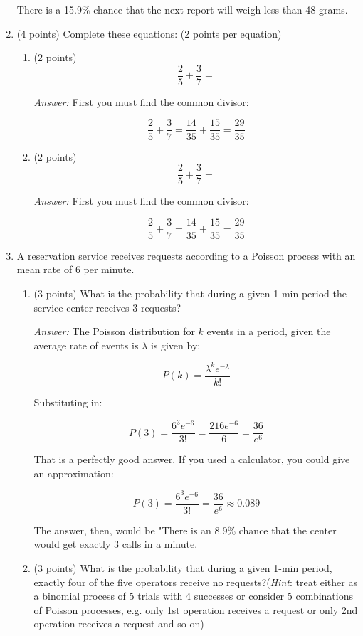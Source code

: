 \documentclass[letterpaper,12pt,addpoints]{exam}
\begin{document}
\begin{enumerate}
There is a 15.9\% chance that the next report will weigh less than 48 grams.

\item (4 points) Complete these equations: (2 points per equation)

\begin{enumerate}
\item (2 points) 
\begin{equation*}
\frac{2}{5} + \frac{3}{7} = 
\end{equation*}

\textit{Answer:}  First you must find the common divisor:

$$\frac{2}{5} + \frac{3}{7} = \frac{14}{35} + \frac{15}{35} =   \frac{29}{35}$$

\item (2 points)
\begin{equation*}
\frac{2}{5} + \frac{3}{7} = 
\end{equation*}

\textit{Answer:}  First you must find the common divisor:

$$\frac{2}{5} + \frac{3}{7} = \frac{14}{35} + \frac{15}{35} =   \frac{29}{35}$$

\end{enumerate}

\item A reservation service receives requests according to a Poisson process with an mean rate of 6 per minute.
\begin{enumerate}
\item (3 points) What is the probability that during a given 1-min period the service center receives 3 requests?

\textit{Answer:} The Poisson distribution for $k$ events in a period, given the average rate of events is $\lambda$ is given by:

$$P(k) = \frac{\lambda^{k}e^{-\lambda}}{k!}$$

Substituting in:

$$P(3) = \frac{6^{3}e^{-6}}{3!} =  \frac{216e^{-6}}{6} = \frac{36}{e^6}$$

That is a perfectly good answer.  If you used a calculator, you could give an approximation:

$$P(3) = \frac{6^{3}e^{-6}}{3!} = \frac{36}{e^6} \approx 0.089$$

The answer, then, would be "There is an 8.9\% chance that the center would get exactly 3 calls in a minute.

\item (3 points) What is the probability that during a given 1-min period, exactly four of the five operators receive no requests?(\textit{Hint}: treat either as a binomial process of 5 trials with 4 successes or consider 5 combinations of Poisson processes, e.g. only 1st operation receives a request  or only 2nd operation receives a request and so on)
\end{enumerate}

\end{enumerate}
\end{document}
